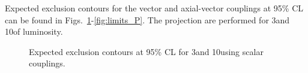 Expected exclusion contours for the vector and axial-vector couplings at 95\% CL can be found in Figs.~\ref{fig:limits_S}-\ref{fig:limits_P}. The projection are performed for 3\fbinv and 10\fbinv of luminosity.


\begin{figure}[h!]
  \centering
  \caption{\label{fig:limits_S} Expected exclusion contours at 95\% CL for 3\fbinv and 10\fbinv using scalar couplings. }
\end{figure}


